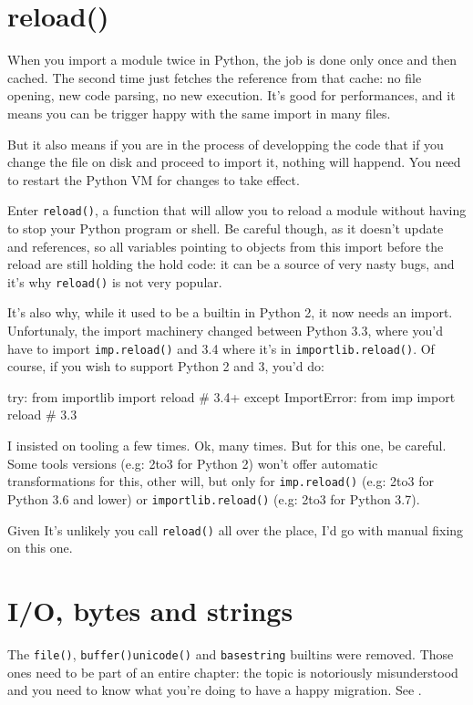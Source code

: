 \section{reload()}

When you import a module twice in Python, the job is done only once and then cached. The second time just fetches the reference from that cache: no file opening, new code parsing, no new execution. It's good for performances, and it means you can be trigger happy with the same import in many files.

But it also means if you are in the process of developping the code that if you change the file on disk and proceed to import it, nothing will happend. You need to restart the Python VM for changes to take effect.

Enter \lstinline{reload()}, a function that will allow you to reload a module without having to stop your Python program or shell. Be careful though, as it doesn't update and references, so all variables pointing to objects from this import before the reload are still holding the hold code: it can be a source of very nasty bugs, and it's why \lstinline{reload()} is not very popular.

It's also why, while it used to be a builtin in Python 2, it now needs an import. Unfortunaly, the import machinery changed between Python 3.3, where you'd have to import \lstinline{imp.reload()} and 3.4 where it's in \lstinline{importlib.reload()}. Of course, if you wish to support Python 2 and 3, you'd do:

\begin{py2and3}
try:
    from importlib import reload # 3.4+
except ImportError:
    from imp import reload # 3.3
\end{py2and3}

I insisted on tooling a few times. Ok, many times. But for this one, be careful. Some tools versions (e.g: 2to3 for Python 2) won't offer automatic transformations for this, other will, but only for \lstinline{imp.reload()} (e.g: 2to3 for Python 3.6 and lower) or \lstinline{importlib.reload()} (e.g: 2to3 for Python 3.7).

Given It's unlikely you call \lstinline{reload()} all over the place, I'd go with manual fixing on this one.

\section{I/O, bytes and strings}

The \lstinline{file()}, \lstinline{buffer()}\lstinline{unicode()} and \lstinline{basestring} \glspl{builtin} were removed. Those ones need to be part of an entire chapter: the topic is notoriously misunderstood and you need to know what you're doing to have a happy migration. See .

